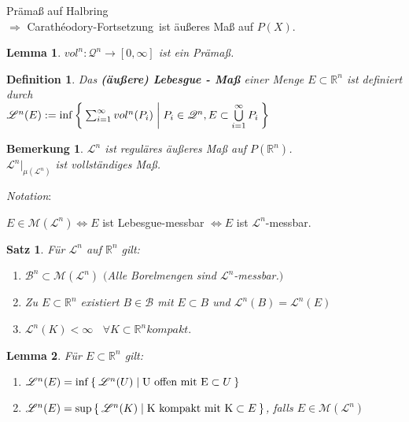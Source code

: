 \documentclass[11pt]{memoir}
\theoremstyle{changebreak}
\newtheorem{Definition}{Definition}[chapter]
\newtheorem{Bemerkung}{Bemerkung}[chapter]
\newtheorem{Lemma}{Lemma}[chapter]
\newtheorem{Satz}{Satz}[chapter]
\newcommand{\cara}{Carathéodory-Fortsetzung}
\begin{document}
	Prämaß auf Halbring\\
	$\Rightarrow$ \cara\, ist äußeres Maß auf $P(X)$.

\begin{Lemma}
	$vol^n : \mathscr{Q}^n \rightarrow [0, \infty]$ ist ein Prämaß.
\end{Lemma}

\begin{Definition}
	Das \textbf{(äußere) Lebesgue - Maß} einer Menge $E \subset \mathbb{R}^n$ ist definiert durch\\
	$ \mathscr{L}^n(E) := \inf \Set{ \sum_{i = 1}^{\infty} vol^n(P_i) | P_i \in \mathscr{Q}^n, E \subset \bigcup\limits_{i = 1}^\infty P_i }$
\end{Definition}

\begin{Bemerkung}
$\mathscr L^n$ ist reguläres äußeres Maß auf $P(\mathbb R^n)$. \\
$\mathscr L^n \vert_{\mu(\mathscr L^n)}$ ist vollständiges Maß.
\end{Bemerkung}

\par
\emph{Notation}: 
\begin{center}
	$E \in \mathscr M(\mathscr L^n) \Leftrightarrow E$ ist Lebesgue-messbar $\Leftrightarrow E$ ist $\mathscr L^n$-messbar.
\end{center}
\par

\begin{Satz}
	Für $\mathscr{L}^n$ auf $\mathbb{R}^n$ gilt:
	\begin{enumerate}
		\item $\mathscr{B}^n \subset \mathscr{M}(\mathscr{L}^n)$ \quad $($Alle Borelmengen sind $\mathscr{L}^n$-messbar.$)$
		\item Zu $E \subset \mathbb{R}^n$ existiert $B \in \mathscr{B}$ mit $E \subset B$
			und $\mathscr{L}^n(B) = \mathscr{L}^n(E)$
		\item $\mathscr{L}^n(K) < \infty$ \, $\forall K \subset \mathbb{R}^n kompakt.$
	\end{enumerate}
\end{Satz}

\begin{Lemma}
	Für $E \subset \mathbb{R}^n$ gilt:
	\begin{enumerate}
		\item $\mathscr{L}^n(E) = \inf\Set{\mathscr{L}^n(U) | \text{U offen mit E} \subset{U}}$
		\item $\mathscr{L}^n(E) = \sup\Set{\mathscr{L}^n(K) | \text{K kompakt mit K} \subset{E}}$,
			falls $E \in \mathscr{M}(\mathscr{L}^n)$
	\end{enumerate}
\end{Lemma}
\end{document}
